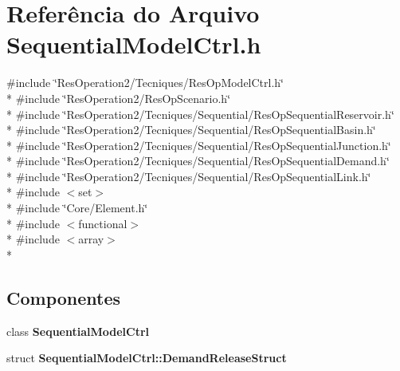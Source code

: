 \section{Referência do Arquivo Sequential\+Model\+Ctrl.\+h}
\label{_sequential_model_ctrl_8h}
{\ttfamily \#include \char`\"{}Res\+Operation2/\+Tecniques/\+Res\+Op\+Model\+Ctrl.\+h\char`\"{}}\\*
{\ttfamily \#include \char`\"{}Res\+Operation2/\+Res\+Op\+Scenario.\+h\char`\"{}}\\*
{\ttfamily \#include \char`\"{}Res\+Operation2/\+Tecniques/\+Sequential/\+Res\+Op\+Sequential\+Reservoir.\+h\char`\"{}}\\*
{\ttfamily \#include \char`\"{}Res\+Operation2/\+Tecniques/\+Sequential/\+Res\+Op\+Sequential\+Basin.\+h\char`\"{}}\\*
{\ttfamily \#include \char`\"{}Res\+Operation2/\+Tecniques/\+Sequential/\+Res\+Op\+Sequential\+Junction.\+h\char`\"{}}\\*
{\ttfamily \#include \char`\"{}Res\+Operation2/\+Tecniques/\+Sequential/\+Res\+Op\+Sequential\+Demand.\+h\char`\"{}}\\*
{\ttfamily \#include \char`\"{}Res\+Operation2/\+Tecniques/\+Sequential/\+Res\+Op\+Sequential\+Link.\+h\char`\"{}}\\*
{\ttfamily \#include $<$set$>$}\\*
{\ttfamily \#include \char`\"{}Core/\+Element.\+h\char`\"{}}\\*
{\ttfamily \#include $<$functional$>$}\\*
{\ttfamily \#include $<$array$>$}\\*
\subsection*{Componentes}
\begin{DoxyCompactItemize}
\item 
class {\bf Sequential\+Model\+Ctrl}
\item 
struct {\bf Sequential\+Model\+Ctrl\+::\+Demand\+Release\+Struct}
\end{DoxyCompactItemize}
